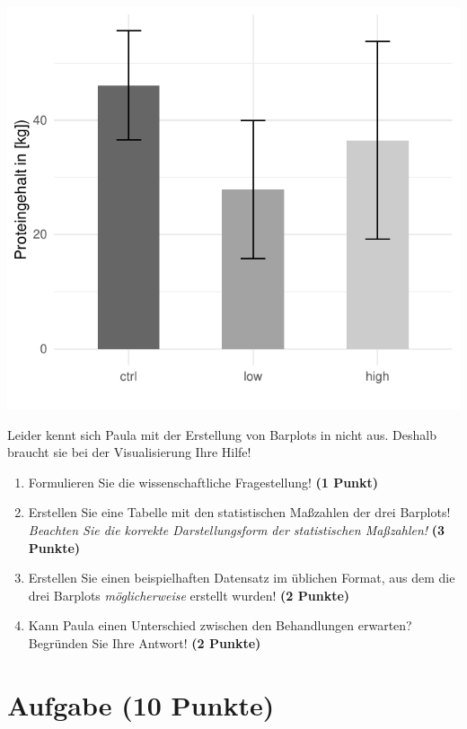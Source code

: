 \documentclass[a4paper, 9pt]{scrartcl}\usepackage[]{graphicx}\usepackage[]{xcolor}
\makeatletter
\def\maxwidth{ %
  \ifdim\Gin@nat@width>\linewidth
    \linewidth
  \else
    \Gin@nat@width
  \fi
}
\makeatother
\begin{document}
{\centering \includegraphics[width=\maxwidth]{img/barplot-02-1} 

}




Leider kennt sich Paula mit der Erstellung von Barplots in \Rlogo nicht aus. Deshalb braucht sie bei der Visualisierung Ihre Hilfe!

\begin{enumerate}
\item Formulieren Sie die wissenschaftliche Fragestellung! \textbf{(1 Punkt)}
\item Erstellen Sie eine Tabelle mit den statistischen Maßzahlen der drei Barplots! \textit{Beachten Sie die korrekte Darstellungsform der statistischen Maßzahlen!} \textbf{(3 Punkte)}
\item Erstellen Sie einen beispielhaften Datensatz im \Rlogo üblichen Format, aus dem die drei Barplots \textit{möglicherweise} erstellt wurden! \textbf{(2 Punkte)}
\item Kann Paula einen Unterschied zwischen den Behandlungen erwarten? Begründen Sie Ihre Antwort! \textbf{(2 Punkte)}
\end{enumerate} 
\clearpage

\section{Aufgabe \hfill (10 Punkte)}
\end{document}
